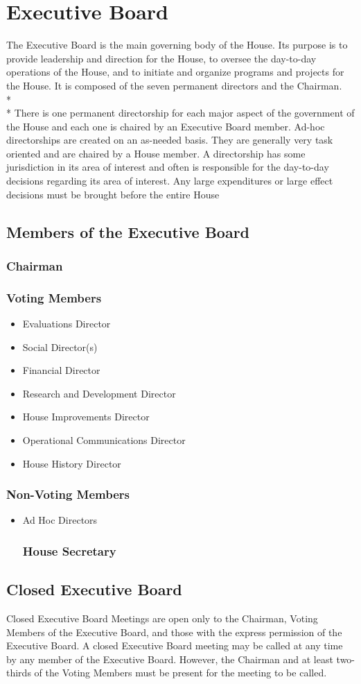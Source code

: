 \documentclass{article}
\newcommand{\article}[1]{\section{#1} \label{#1}}
\newcommand{\asection}[1]{\subsection{#1} \label{#1}}
\newcommand{\asubsection}[1]{\subsubsection{#1} \label{#1}}
\begin{document}
\article{Executive Board}
The Executive Board is the main governing body of the House. Its purpose is to provide leadership and direction for the House, to oversee the day-to-day operations of the House, and to initiate and organize programs and projects for the House. It is composed of the seven permanent directors and the Chairman.
\\*\\*
There is one permanent directorship for each major aspect of the government of the House and each one is chaired by an Executive Board member. Ad-hoc directorships are created on an as-needed basis. They are generally very task oriented and are chaired by a House member. A directorship has some jurisdiction in its area of interest and often is responsible for the day-to-day decisions regarding its area of interest. Any large expenditures or large effect decisions must be brought before the entire House
\asection{Members of the Executive Board}
\asubsection{Chairman}
\asubsection{Voting Members}
\begin{itemize}
	\item Evaluations Director
	\item Social Director(s)
	\item Financial Director
	\item Research and Development Director
	\item House Improvements Director
	\item Operational Communications Director
	\item House History Director
\end{itemize}
\asubsection{Non-Voting Members}
\begin{itemize}
	\item Ad Hoc Directors
\asubsection{House Secretary}
\end{itemize}
\asection{Closed Executive Board}
Closed Executive Board Meetings are open only to the Chairman, Voting Members of the Executive Board, and those with the express permission of the Executive Board. A closed Executive Board meeting may be called at any time by any member of the Executive Board. However, the Chairman and at least two-thirds of the Voting Members must be present for the meeting to be called.
\end{document}
